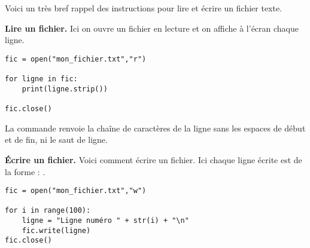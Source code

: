 \documentclass[11pt,class=report,crop=false]{standalone}
\begin{document}
\begin{cours}
	
	
Voici un très bref rappel des instructions \Python{} pour lire et écrire un fichier texte.

\textbf{Lire un fichier.} 
Ici on ouvre un fichier en lecture et on affiche à l'écran chaque ligne.
\begin{lstlisting}
fic = open("mon_fichier.txt","r")

for ligne in fic:
    print(ligne.strip())

fic.close()
\end{lstlisting}

La commande  renvoie la chaîne de caractères de la ligne sans les espaces de début et de fin, ni le saut de ligne. 

\bigskip

\textbf{\'Ecrire un fichier.} 
Voici comment écrire un fichier. Ici chaque ligne écrite est de la forme : .
\begin{lstlisting}
fic = open("mon_fichier.txt","w")

for i in range(100):
	ligne = "Ligne numéro " + str(i) + "\n"
	fic.write(ligne)
fic.close()
\end{lstlisting}
\end{cours}



\end{document}
